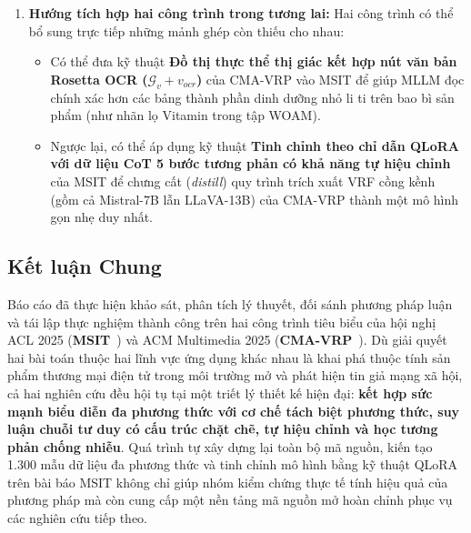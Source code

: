 \documentclass[conference,10pt]{IEEEtran}
\begin{document}
\begin{enumerate}
\begin{itemize}
    \end{itemize}
    \item \textbf{Hướng tích hợp hai công trình trong tương lai:}
    Hai công trình có thể bổ sung trực tiếp những mảnh ghép còn thiếu cho nhau:
    \begin{itemize}
        \item Có thể đưa kỹ thuật \textbf{Đồ thị thực thể thị giác kết hợp nút văn bản Rosetta OCR ($\mathcal{G}_v + v_{ocr}$)} của CMA-VRP vào MSIT để giúp MLLM đọc chính xác hơn các bảng thành phần dinh dưỡng nhỏ li ti trên bao bì sản phẩm (như nhãn lọ Vitamin trong tập WOAM).
        \item Ngược lại, có thể áp dụng kỹ thuật \textbf{Tinh chỉnh theo chỉ dẫn QLoRA với dữ liệu CoT 5 bước tương phản có khả năng tự hiệu chỉnh} của MSIT để chưng cất (\textit{distill}) quy trình trích xuất VRF cồng kềnh (gồm cả Mistral-7B lẫn LLaVA-13B) của CMA-VRP thành một mô hình gọn nhẹ duy nhất.
    \end{itemize}
\end{enumerate}

\subsection{Kết luận Chung}

Báo cáo đã thực hiện khảo sát, phân tích lý thuyết, đối sánh phương pháp luận và tái lập thực nghiệm thành công trên hai công trình tiêu biểu của hội nghị ACL 2025 (\textbf{MSIT}~\cite{li2025msit}) và ACM Multimedia 2025 (\textbf{CMA-VRP}~\cite{li2025cmavrp}). Dù giải quyết hai bài toán thuộc hai lĩnh vực ứng dụng khác nhau là khai phá thuộc tính sản phẩm thương mại điện tử trong môi trường mở và phát hiện tin giả mạng xã hội, cả hai nghiên cứu đều hội tụ tại một triết lý thiết kế hiện đại: \textbf{kết hợp sức mạnh biểu diễn đa phương thức với cơ chế tách biệt phương thức, suy luận chuỗi tư duy có cấu trúc chặt chẽ, tự hiệu chỉnh và học tương phản chống nhiễu}. Quá trình tự xây dựng lại toàn bộ mã nguồn, kiến tạo 1.300 mẫu dữ liệu đa phương thức và tinh chỉnh mô hình bằng kỹ thuật QLoRA trên bài báo MSIT không chỉ giúp nhóm kiểm chứng thực tế tính hiệu quả của phương pháp mà còn cung cấp một nền tảng mã nguồn mở hoàn chỉnh phục vụ các nghiên cứu tiếp theo.
\end{document}

